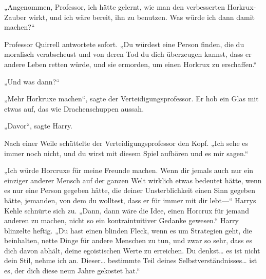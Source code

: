 „Angenommen, Professor, ich hätte gelernt, wie man den verbesserten Horkrux-Zauber wirkt, und ich wäre bereit, ihn zu benutzen. Was würde ich dann damit machen?“

Professor Quirrell antwortete sofort.
„Du würdest eine Person finden, die du moralisch verabscheust und von deren Tod du dich überzeugen kannst, dass er andere Leben retten würde, und sie ermorden, um einen Horkrux zu erschaffen.“

„Und was dann?“

„Mehr Horkruxe machen“, sagte der Verteidigungsprofessor.
Er hob ein Glas mit etwas auf, das wie Drachenschuppen aussah.

„Davor“, sagte Harry.

Nach einer Weile schüttelte der Verteidigungsprofessor den Kopf.
„Ich sehe es immer noch nicht, und du wirst mit diesem Spiel aufhören und es mir sagen.“

„Ich würde Horcruxe für meine Freunde machen. Wenn dir jemals auch nur ein einziger anderer Mensch auf der ganzen Welt wirklich etwas bedeutet hätte, wenn es nur eine Person gegeben hätte, die deiner Unsterblichkeit einen Sinn gegeben hätte, jemanden, von dem du wolltest, dass er für immer mit dir lebt—“
Harrys Kehle schnürte sich zu.
„Dann, dann wäre die Idee, einen Horcrux für jemand anderen zu machen, nicht so ein kontraintuitiver Gedanke gewesen.“
Harry blinzelte heftig.
„Du hast einen blinden Fleck, wenn es um Strategien geht, die beinhalten, nette Dinge für andere Menschen zu tun, und zwar so sehr, dass es dich davon abhält, deine egoistischen Werte zu erreichen. Du denkst… es ist nicht dein Stil, nehme ich an. Dieser… bestimmte Teil deines Selbstverständnisses… ist es, der dich diese neun Jahre gekostet hat.“

